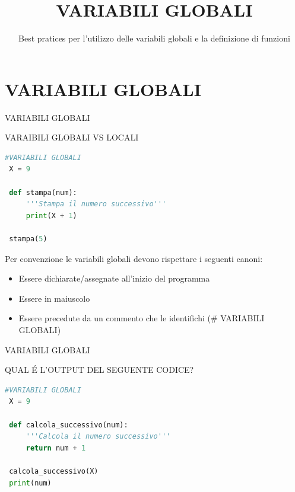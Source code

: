 \documentclass[aspectratio=1610]{beamer}
\title{VARIABILI GLOBALI}
\subtitle{Best pratices per l'utilizzo delle variabili globali e la definizione di funzioni}
\date{}
\institute{\textit{
        Fonti:
        \begin{itemize}
            \item[-] \href{https://docs.python.org/it/3.15/tutorial/controlflow.html}{Definizione di Funzioni - Documentazione Ufficiale Python}
        \end{itemize}
    }
}
\begin{document}
\begin{frame}
    \titlepage
\end{frame}

\section{VARIABILI GLOBALI}

\begin{frame}[fragile]{VARIABILI GLOBALI}
    \begin{alertblock}{VARAIBILI GLOBALI VS LOCALI}
        \begin{minipage}{0.98\linewidth}
\begin{lstlisting}[language=Python]
 #VARIABILI GLOBALI
 X = 9
 
 def stampa(num):
     '''Stampa il numero successivo'''
     print(X + 1)
 
 stampa(5)
\end{lstlisting}
\pause
Per convenzione le variabili globali devono rispettare i seguenti canoni:
\begin{itemize}
    \item Essere dichiarate/assegnate all'inizio del programma
    \item Essere in maiuscolo
    \item Essere precedute da un commento che le identifichi (\# VARIABILI GLOBALI)
\end{itemize}
        \end{minipage}
    \end{alertblock}
\end{frame}

\begin{frame}[fragile]{VARIABILI GLOBALI}
    \begin{alertblock}{QUAL \'E L'OUTPUT DEL SEGUENTE CODICE?}
        \begin{minipage}{0.98\linewidth}
\begin{lstlisting}[language=Python]
 #VARIABILI GLOBALI
 X = 9
 
 def calcola_successivo(num):
     '''Calcola il numero successivo'''
     return num + 1
 
 calcola_successivo(X)
 print(num)
\end{lstlisting}
\pause
{}
        \end{minipage}
    \end{alertblock}
\end{frame}
\end{document}
